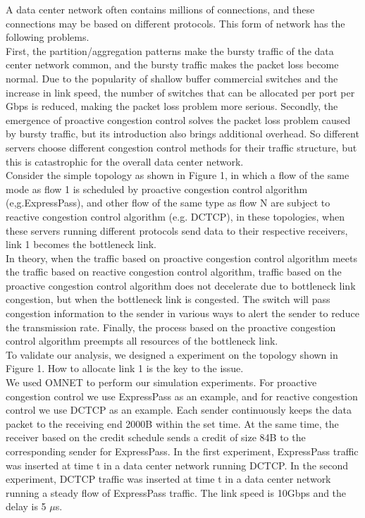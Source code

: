 \documentclass[conference]{IEEEtran}
\begin{document}
A data center network often contains millions of connections\cite{Alizadeh2010Data}, and these connections may be based on different protocols. This form of network has the following problems.\\
\indent First, the partition/aggregation patterns\cite{Alizadeh2010Data} make the bursty traffic\cite{benson2010network} of the data center network common, and the bursty traffic makes the packet loss become normal. Due to the popularity of shallow buffer commercial switches and the increase in link speed, the number of switches that can be allocated per port per Gbps is reduced, making the packet loss problem more serious. Secondly, the emergence of proactive congestion control solves the packet loss problem caused by bursty traffic, but its introduction also brings additional overhead. So different servers choose different congestion control methods for their traffic structure, but this is catastrophic for the overall data center network.\\
\indent Consider the simple topology as shown in Figure 1, in which a flow of the same mode as flow 1 is scheduled by proactive congestion control algorithm (e,g.ExpressPass\cite{cho2017credit}), and other flow of the same type as flow N are subject to reactive congestion control algorithm (e.g. DCTCP\cite{Alizadeh2010Data}), in these topologies, when these servers running different protocols send data to their respective receivers, link 1 becomes the bottleneck link.\\
\indent In theory, when the traffic based on proactive congestion control algorithm meets the traffic based on reactive congestion control algorithm, traffic based on the proactive congestion control algorithm does not decelerate due to bottleneck link congestion, but when the bottleneck link is congested.  The switch will pass congestion information to the sender in various ways to alert the sender to reduce the transmission rate. Finally, the process based on the proactive congestion control algorithm preempts all resources of the bottleneck link.\\
\indent To validate our analysis, we designed a experiment on the topology shown in Figure 1. How to allocate link 1 is the key to the issue.\\
\indent We used OMNET\cite{pongor1993omnet} to perform our simulation experiments. For proactive congestion control we use ExpressPass\cite{cho2017credit} as an example, and for reactive congestion control we use DCTCP\cite{Alizadeh2010Data} as an example. Each sender continuously keeps the data packet to the receiving end 2000B within the set time. At the same time, the receiver based on the credit schedule sends a credit of size 84B to the corresponding sender for ExpressPass. In the first experiment, ExpressPass traffic was inserted at time t in a data center network running DCTCP. In the second experiment, DCTCP traffic was inserted at time t in a data center network running a steady flow of ExpressPass traffic. The link speed is 10Gbps and the delay is 5 $\mu$s.\\
\end{document}
